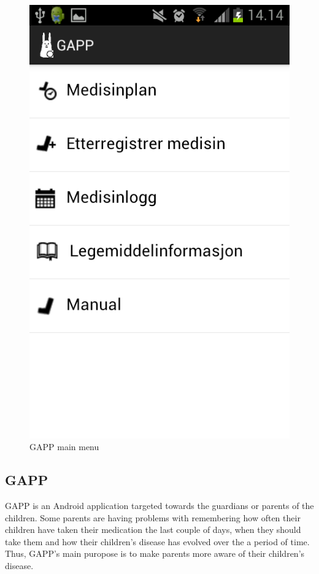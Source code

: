\begin{figure}[H]
\begin{minipage}[b]{0.4\linewidth}
		\includegraphics[width=0.20\paperwidth]{Pictures/app-screenshots/gapp_main_menu.png}
		\caption{GAPP main menu}
		\label{fig:gapp-main-menu1}
	\end{minipage}
\end{figure}


\subsection{GAPP}
\label{sec:description-gapp}
GAPP is an Android application targeted towards the guardians or parents of the children. 
Some parents are having problems with remembering how often their children have taken their medication the last couple of days, when they should take them and how their children's disease has evolved over the a period of time. Thus, GAPP's main puropose is to make parents more aware of their children's disease.   


